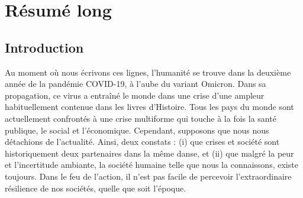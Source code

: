 \chapter*{Résumé long}

\section*{Introduction}
Au moment où nous écrivons ces lignes, l'humanité se trouve dans la deuxième année de la pandémie COVID-19, à l'aube du variant Omicron.
Dans sa propagation, ce virus a entraîné le monde dans une crise d'une ampleur habituellement contenue dans les livres d'Histoire.
Tous les pays du monde sont actuellement confrontés à une crise multiforme qui touche à la fois la santé publique, le social et l'économique.
Cependant, supposons que nous nous détachions de l'actualité.
Ainsi, deux constats : (i) que crises et société sont historiquement deux partenaires dans la même danse, et (ii) que malgré la peur et l'incertitude ambiante, la société humaine telle que nous la connaissons, existe toujours.
Dans le feu de l'action, il n'est pas facile de percevoir l'extraordinaire résilience de nos sociétés, quelle que soit l'époque.

